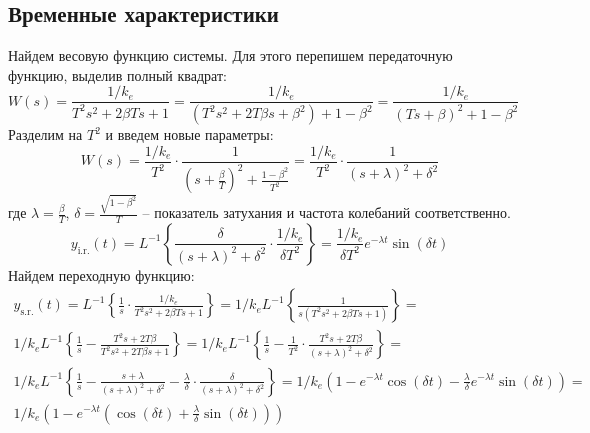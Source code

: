 \subsection{Временные характеристики}
\noindent Найдем весовую функцию системы. Для этого перепишем передаточную функцию, выделив полный квадрат: 
\begin{equation}
    W(s) = \frac{1/k_e}{T^2s^2 + 2\beta Ts + 1} = \frac{1/k_e}{(T^2s^2 + 2T\beta s + \beta^2) + 1 - \beta^2} = \frac{1/k_e}{(Ts + \beta)^2 + 1 - \beta^2} 
\end{equation}
Разделим на $T^2$ и введем новые параметры: 
\begin{equation}
    W(s) = \frac{1/k_e}{T^2}\cdot\frac{1}{(s + \frac{\beta}{T})^2 + \frac{1 - \beta^2}{T^2}} = \frac{1/k_e}{T^2}\cdot\frac{1}{(s + \lambda)^2 + \delta^2}
\end{equation}
где $\lambda = \frac{\beta}{T}$, $\delta = \frac{\sqrt{1 - \beta^2}}{T}$ -- показатель затухания и частота колебаний соответственно.
\begin{equation}
    y_{\text{i.r.}}(t) = L^{-1}\left\{\frac{\delta}{(s + \lambda)^2 + \delta^2}\cdot\frac{1/k_e}{\delta T^2}\right\} = \frac{1/k_e}{\delta T^2}e^{-\lambda t}\sin(\delta t)
\end{equation}
Найдем переходную функцию:
\begin{multline}
    y_{\text{s.r.}}(t) = L^{-1}\left\{ \frac{1}{s}\cdot\frac{1/k_e}{T^2s^2 + 2\beta Ts + 1} \right\} = 1/k_eL^{-1}\left\{ \frac{1}{s(T^2s^2 + 2\beta Ts + 1)} \right\} =  \\
    1/k_eL^{-1}\left\{ \frac{1}{s} - \frac{T^2s +2T\beta}{T^2s^2 +2T\beta s + 1} \right\} = 1/k_eL^{-1}\left\{ \frac{1}{s} - \frac{1}{T^2}\cdot\frac{T^2s +2T\beta}{(s + \lambda)^2+\delta^2} \right\} = \\
    1/k_e L^{-1} \left\{ \frac{1}{s} - \frac{s + \lambda}{(s + \lambda)^2 + \delta^2} -\frac{\lambda}{\delta} \cdot \frac{\delta}{(s + \lambda)^2 + \delta^2} \right\} = 1/k_e(1 - e^{-\lambda t}\cos(\delta t) - \frac{\lambda}{\delta} e^{-\lambda t} \sin(\delta t)) = \\
    1/k_e(1 - e^{-\lambda t}(\cos(\delta t) +\frac{\lambda}{\delta}\sin(\delta t)))
\end{multline}


